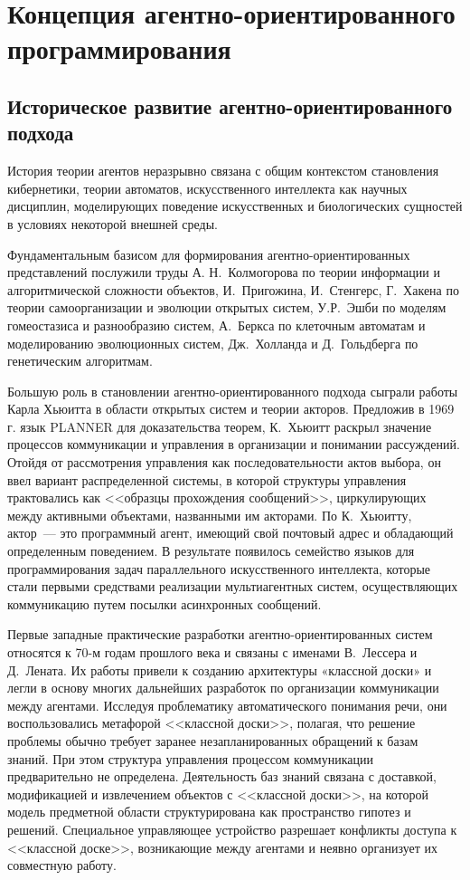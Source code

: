 \section{Концепция агентно-ориентированного программирования}
\subsection{Историческое развитие агентно-ориентированного подхода}
История теории агентов неразрывно связана с общим контекстом становления кибернетики, теории автоматов, искусственного интеллекта как научных дисциплин, моделирующих поведение искусственных и биологических сущностей в условиях некоторой внешней среды.

Фундаментальным базисом для формирования агентно-ориентированных представлений послужили труды А. Н.~Колмогорова по теории информации и алгоритмической сложности объектов, И.~Пригожина, И.~Стенгерс, Г.~Хакена по теории самоорганизации и эволюции открытых систем, У.Р.~Эшби по моделям гомеостазиса и разнообразию систем, А.~Беркса по клеточным автоматам и моделированию эволюционных систем, Дж.~Холланда и Д.~Гольдберга по генетическим алгоритмам.

Большую роль в становлении агентно-ориентированного подхода сыграли работы Карла Хьюитта в области открытых систем и теории акторов. Предложив в 1969 г. язык PLANNER для доказательства теорем, К.~Хьюитт раскрыл значение процессов коммуникации и управления в организации и понимании рассуждений. Отойдя от рассмотрения управления как последовательности актов выбора, он ввел вариант распределенной системы, в которой структуры управления трактовались как <<образцы прохождения сообщений>>, циркулирующих между активными объектами, названными им акторами. По К.~Хьюитту, актор~--- это программный агент, имеющий свой почтовый адрес и обладающий определенным поведением. В результате появилось семейство языков для программирования задач параллельного искусственного интеллекта, которые стали первыми средствами реализации мультиагентных систем, осуществляющих коммуникацию путем посылки асинхронных сообщений.

Первые западные практические разработки агентно-ориентированных систем  относятся к 70-м годам прошлого века и связаны с именами В.~Лессера и Д.~Лената. Их работы привели к созданию архитектуры «классной доски» и легли в основу многих дальнейших разработок по организации коммуникации между агентами. Исследуя проблематику автоматического понимания речи, они воспользовались метафорой <<классной доски>>, полагая, что решение проблемы обычно требует заранее незапланированных обращений к базам знаний. При этом структура управления процессом коммуникации предварительно не определена. Деятельность баз знаний связана с доставкой, модификацией и извлечением объектов с <<классной доски>>, на которой модель предметной области структурирована как пространство гипотез и решений. Специальное управляющее устройство разрешает конфликты доступа к <<классной доске>>, возникающие между агентами и неявно организует их совместную работу.

